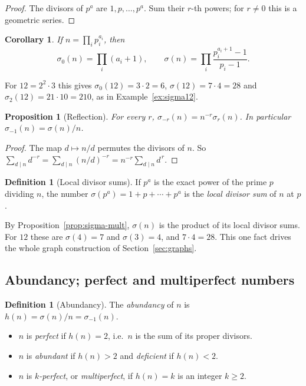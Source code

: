 \documentclass[11pt]{article}
\newtheorem{proposition}[theorem]{Proposition}
\newtheorem{corollary}[theorem]{Corollary}
\theoremstyle{definition}
\newtheorem{definition}[theorem]{Definition}
\theoremstyle{remark}
\begin{document}
\begin{proof}
The divisors of $p^a$ are $1,p,\dots,p^a$.  Sum their $r$-th powers; for
$r\ne0$ this is a geometric series.
\end{proof}

\begin{corollary}\label{cor:sigma01}
If $n=\prod_i p_i^{a_i}$, then
\[
\sigma_0(n)=\prod_i(a_i+1),\qquad
\sigma(n)=\prod_i\frac{p_i^{a_i+1}-1}{p_i-1}.
\]
\end{corollary}

For $12=2^2\cdot3$ this gives $\sigma_0(12)=3\cdot2=6$,
$\sigma(12)=7\cdot4=28$ and $\sigma_2(12)=21\cdot10=210$, as in
Example~\ref{ex:sigma12}.

\begin{proposition}[Reflection]\label{prop:reflection}
For every $r$, $\sigma_{-r}(n)=n^{-r}\sigma_r(n)$.  In particular
$\sigma_{-1}(n)=\sigma(n)/n$.
\end{proposition}

\begin{proof}
The map $d\mapsto n/d$ permutes the divisors of $n$.  So
$\sum_{d\mid n}d^{-r}=\sum_{d\mid n}(n/d)^{-r}=n^{-r}\sum_{d\mid n}d^{\,r}$.
\end{proof}

\begin{definition}[Local divisor sums]
If $p^a$ is the exact power of the prime $p$ dividing $n$, the number
$\sigma(p^a)=1+p+\cdots+p^a$ is the \emph{local divisor sum} of $n$ at $p$.
\end{definition}

By Proposition~\ref{prop:sigma-mult}, $\sigma(n)$ is the product of its local
divisor sums.  For $12$ these are $\sigma(4)=7$ and $\sigma(3)=4$, and
$7\cdot4=28$.  This one fact drives the whole graph construction of
Section~\ref{sec:graphs}.

\subsection{Abundancy; perfect and multiperfect numbers}\label{sec:perfect}

\begin{definition}[Abundancy]
The \emph{abundancy} of $n$ is $h(n)=\sigma(n)/n=\sigma_{-1}(n)$.
\begin{itemize}[leftmargin=1.5em]
\item $n$ is \emph{perfect} if $h(n)=2$, i.e.\ $n$ is the sum of its proper
  divisors.
\item $n$ is \emph{abundant} if $h(n)>2$ and \emph{deficient} if $h(n)<2$.
\item $n$ is \emph{$k$-perfect}, or \emph{multiperfect}, if $h(n)=k$ is an
  integer $k\ge2$.
\end{itemize}
\end{definition}
\end{document}
